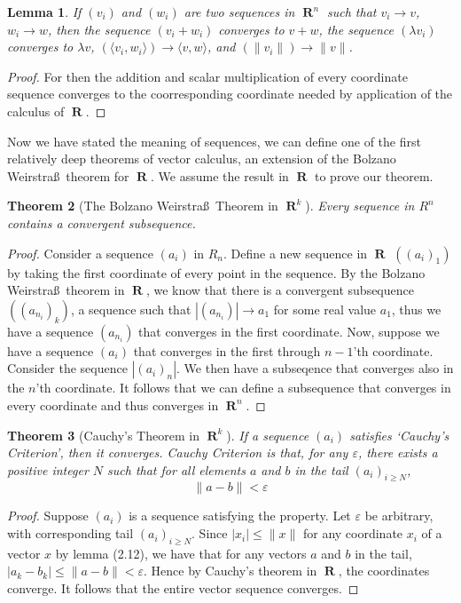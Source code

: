 \documentclass{report}
\newtheorem{theorem}{Theorem}[chapter]
\newtheorem{lemma}[theorem]{Lemma}
\DeclareMathOperator{\real}{\mathbf{R}}
\begin{document}
\begin{lemma}
  If $(v_i)$ and $(w_i)$ are two sequences in $\real^n$ such that $v_i \to v$, $w_i \to w$, then the sequence $(v_i + w_i)$ converges to $v + w$, the sequence $(\lambda v_i)$ converges to $\lambda v$, $(\langle v_i, w_i \rangle) \to \langle v, w \rangle$, and $(\|v_i\|) \to \|v\|$.
\end{lemma}
\begin{proof}
  For then the addition and scalar multiplication of every coordinate sequence converges to the coorresponding coordinate needed by application of the calculus of $\real$.
\end{proof}

Now we have stated the meaning of sequences, we can define one of the first relatively deep theorems of vector calculus, an extension of the Bolzano Weirstra\ss\ theorem for $\real$. We assume the result in $\real$ to prove our theorem.

\begin{theorem}[The Bolzano Weirstra\ss\ Theorem in $\real^k$]
  Every sequence in $R^n$ contains a convergent subsequence.
\end{theorem}
\begin{proof}
  Consider a sequence $(a_i)$ in $R_n$. Define a new sequence in $\real$ $((a_i)_1)$ by taking the first coordinate of every point in the sequence. By the Bolzano Weirstra\ss\ theorem in $\real$, we know that there is a convergent subsequence $((a_{n_i})_k)$, a sequence such that $|(a_{n_i})| \to a_1$ for some real value $a_1$, thus we have a sequence $(a_{n_i})$ that converges in the first coordinate. Now, suppose we have a sequence $(a_i)$ that converges in the first through $n-1$'th coordinate. Consider the sequence $|(a_i)_n|$. We then have a subseqence that converges also in the $n$'th coordinate. It follows that we can define a subsequence that converges in every coordinate and thus converges in $\real^n$.
\end{proof}

\begin{theorem}[Cauchy's Theorem in $\real^k$]
  If a sequence $(a_i)$ satisfies `Cauchy's Criterion', then it converges. Cauchy Criterion is that, for any $\varepsilon$, there exists a positive integer $N$ such that for all elements $a$ and $b$ in the tail $(a_i)_{i \geq N}$,
  \[ \| a - b \| < \varepsilon \]
\end{theorem}
\begin{proof}
  Suppose $(a_i)$ is a sequence satisfying the property. Let $\varepsilon$ be arbitrary, with corresponding tail $(a_i)_{i \geq N}$. Since $|x_i| \leq \|x\|$ for any coordinate $x_i$ of a vector $x$ by lemma (2.12), we have that for any vectors $a$ and $b$ in the tail, $|a_k - b_k| \leq \|a - b\| < \varepsilon$. Hence by Cauchy's theorem in $\real$, the coordinates converge. It follows that the entire vector sequence converges.
\end{proof}
\end{document}
